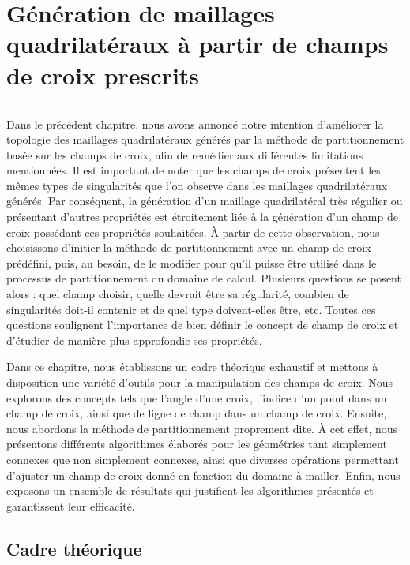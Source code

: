 \chapter{Génération de maillages quadrilatéraux à partir de champs de croix prescrits}
\label{chap:theoritical}
\minitoc

\[\]

Dans le précédent chapitre, nous avons annoncé notre intention d'améliorer la topologie des maillages quadrilatéraux générés par la méthode de partitionnement basée sur les champs de croix, afin de remédier aux différentes limitations mentionnées. Il est important de noter que les champs de croix présentent les mêmes types de singularités que l'on observe dans les maillages quadrilatéraux générés. Par conséquent, la génération d'un maillage quadrilatéral très régulier ou présentant d'autres propriétés est étroitement liée à la génération d'un champ de croix possédant ces propriétés souhaitées. À partir de cette observation, nous choisissons d'initier la méthode de partitionnement avec un champ de croix prédéfini, puis, au besoin, de le modifier pour qu'il puisse être utilisé dans le processus de partitionnement du domaine de calcul. Plusieurs questions se posent alors : quel champ choisir, quelle devrait être sa régularité, combien de singularités doit-il contenir et de quel type doivent-elles être, etc. Toutes ces questions soulignent l'importance de bien définir le concept de champ de croix et d'étudier de manière plus approfondie ses propriétés.

Dans ce chapitre, nous établissons un cadre théorique exhaustif et mettons à disposition une variété d'outils pour la manipulation des champs de croix. Nous explorons des concepts tels que l'angle d'une croix, l'indice d'un point dans un champ de croix, ainsi que de ligne de champ dans un champ de croix. Ensuite, nous abordons la méthode de partitionnement proprement dite. À cet effet, nous présentons différents algorithmes élaborés pour les géométries tant simplement connexes que non simplement connexes, ainsi que diverses opérations permettant d'ajuster un champ de croix donné en fonction du domaine à mailler. Enfin, nous exposons un ensemble de résultats qui justifient les algorithmes présentés et garantissent leur efficacité.



\section{Cadre théorique}

